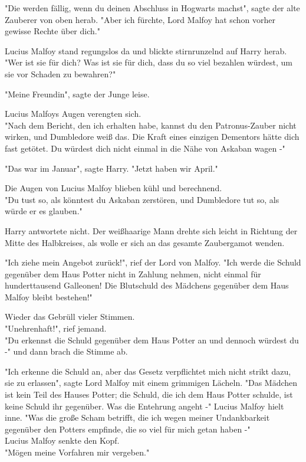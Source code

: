 {"Die werden fällig, wenn du deinen Abschluss in Hogwarts machst", sagte der alte Zauberer von oben herab. "Aber ich fürchte, Lord Malfoy hat schon vorher gewisse Rechte über dich."

Lucius Malfoy stand regungslos da und blickte stirnrunzelnd auf Harry herab.\\ "Wer ist sie für dich? Was ist sie für dich, dass du so viel bezahlen würdest, um sie vor Schaden zu bewahren?"

"Meine Freundin", sagte der Junge leise.

Lucius Malfoys Augen verengten sich.\\ "Nach dem Bericht, den ich erhalten habe, kannst du den Patronus-Zauber nicht wirken, und Dumbledore weiß das. Die Kraft eines einzigen Dementors hätte dich fast getötet. Du würdest dich nicht einmal in die Nähe von Askaban wagen -"

"Das war im Januar", sagte Harry. "Jetzt haben wir April."

Die Augen von Lucius Malfoy blieben kühl und berechnend.\\ "Du tust so, als könntest du Askaban zerstören, und Dumbledore tut so, als würde er es glauben."

Harry antwortete nicht. Der weißhaarige Mann drehte sich leicht in Richtung der Mitte des Halbkreises, als wolle er sich an das gesamte Zaubergamot wenden.

"Ich ziehe mein Angebot zurück!", rief der Lord von Malfoy. "Ich werde die Schuld gegenüber dem Haus Potter nicht in Zahlung nehmen, nicht einmal für hunderttausend Galleonen! Die Blutschuld des Mädchens gegenüber dem Haus Malfoy bleibt bestehen!"

Wieder das Gebrüll vieler Stimmen.\\ "Unehrenhaft!", rief jemand.\\ "Du erkennst die Schuld gegenüber dem Haus Potter an und dennoch würdest du -" und dann brach die Stimme ab.

"Ich erkenne die Schuld an, aber das Gesetz verpflichtet mich nicht strikt dazu, sie zu erlassen", sagte Lord Malfoy mit einem grimmigen Lächeln. "Das Mädchen ist kein Teil des Hauses Potter; die Schuld, die ich dem Haus Potter schulde, ist keine Schuld ihr gegenüber. Was die Entehrung angeht -" Lucius Malfoy hielt inne. "Was die große Scham betrifft, die ich wegen meiner Undankbarkeit gegenüber den Potters empfinde, die so viel für mich getan haben -"\\ Lucius Malfoy senkte den Kopf.\\ "Mögen meine Vorfahren mir vergeben."

}
